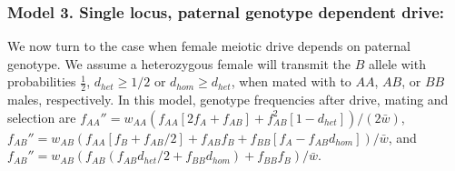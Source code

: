 \documentclass[12pt,letterpaper]{article}
\newcommand{\gc}[1]{{ \color{red} #1}}
\begin{document}
\subsubsection*{Model 3. Single locus, paternal genotype dependent drive:}
\gc{We now turn to the case when} female meiotic drive depends on paternal genotype.
 We assume a heterozygous female will transmit the $B$ allele 
  with probabilities  $\frac{1}{2}$,  $d_{het}\geq 1/2 $ or $d_{hom}\geq d_{het}$, 
 when mated with to $AA$, $AB$, or $BB$ males,  respectively. 
  In this model, genotype frequencies after drive, mating and selection are 
  	$f_{AA}'' =   w_{AA}\left( f_{AA} [2 f_A + f_{AB} ] + f_{AB}^2 [1 - d_{het}] \right)/(2\bar{w})$,
	$f_{AB}'' =   w_{AB}(f_{AA} [f_B + f_{AB}/2] + f_{AB} f_B + f_{BB} [ f_A - f_{AB} d_{hom}])/\bar{w}$, 
	and 	$f_{AB}'' =   w_{AB}(f_{AB} (f_{AB} d_{het}/2 + f_{BB} d_{hom}) + f_{BB} f_B)/\bar{w}$. 
\end{document}
